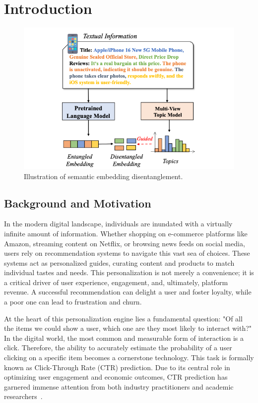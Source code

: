 \chapter{Introduction}

\label{chap:introduction}

\begin{figure}[t]
    \centering
    \includegraphics[width=0.9\linewidth]{Figures/Chapter1/figure1.png}
    \caption{Illustration of semantic embedding disentanglement.}
    \label{fig:disentangle}
\end{figure}

\section{Background and Motivation}

In the modern digital landscape, individuals are inundated with a virtually infinite amount of information. Whether shopping on e-commerce platforms like Amazon, streaming content on Netflix, or browsing news feeds on social media, users rely on recommendation systems to navigate this vast sea of choices. These systems act as personalized guides, curating content and products to match individual tastes and needs. This personalization is not merely a convenience; it is a critical driver of user experience, engagement, and, ultimately, platform revenue. A successful recommendation can delight a user and foster loyalty, while a poor one can lead to frustration and churn.

At the heart of this personalization engine lies a fundamental question: "Of all the items we could show a user, which one are they most likely to interact with?" In the digital world, the most common and measurable form of interaction is a click. Therefore, the ability to accurately estimate the probability of a user clicking on a specific item becomes a cornerstone technology. This task is formally known as Click-Through Rate (CTR) prediction. Due to its central role in optimizing user engagement and economic outcomes, CTR prediction has garnered immense attention from both industry practitioners and academic researchers~\cite{chen2016deep, zhou2018deep}.

